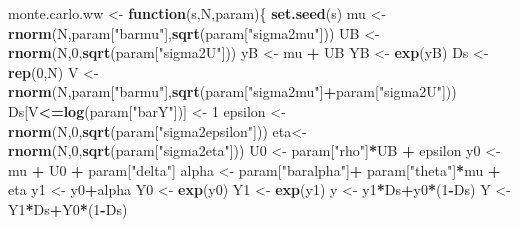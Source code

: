 \documentclass[]{book}
\newenvironment{Shaded}{\begin{snugshade}}{\end{snugshade}}
\newcommand{\KeywordTok}[1]{\textcolor[rgb]{0.13,0.29,0.53}{\textbf{#1}}}
\newcommand{\DecValTok}[1]{\textcolor[rgb]{0.00,0.00,0.81}{#1}}
\newcommand{\StringTok}[1]{\textcolor[rgb]{0.31,0.60,0.02}{#1}}
\newcommand{\ControlFlowTok}[1]{\textcolor[rgb]{0.13,0.29,0.53}{\textbf{#1}}}
\newcommand{\OperatorTok}[1]{\textcolor[rgb]{0.81,0.36,0.00}{\textbf{#1}}}
\newcommand{\NormalTok}[1]{#1}
\theoremstyle{definition}
\theoremstyle{definition}
\theoremstyle{definition}
\theoremstyle{remark}
\begin{document}
\begin{Shaded}
\begin{Highlighting}[]
\NormalTok{monte.carlo.ww <-}\StringTok{ }\ControlFlowTok{function}\NormalTok{(s,N,param)\{}
  \KeywordTok{set.seed}\NormalTok{(s)}
\NormalTok{  mu <-}\StringTok{ }\KeywordTok{rnorm}\NormalTok{(N,param[}\StringTok{"barmu"}\NormalTok{],}\KeywordTok{sqrt}\NormalTok{(param[}\StringTok{"sigma2mu"}\NormalTok{]))}
\NormalTok{  UB <-}\StringTok{ }\KeywordTok{rnorm}\NormalTok{(N,}\DecValTok{0}\NormalTok{,}\KeywordTok{sqrt}\NormalTok{(param[}\StringTok{"sigma2U"}\NormalTok{]))}
\NormalTok{  yB <-}\StringTok{ }\NormalTok{mu }\OperatorTok{+}\StringTok{ }\NormalTok{UB }
\NormalTok{  YB <-}\StringTok{ }\KeywordTok{exp}\NormalTok{(yB)}
\NormalTok{  Ds <-}\StringTok{ }\KeywordTok{rep}\NormalTok{(}\DecValTok{0}\NormalTok{,N)}
\NormalTok{  V <-}\StringTok{ }\KeywordTok{rnorm}\NormalTok{(N,param[}\StringTok{"barmu"}\NormalTok{],}\KeywordTok{sqrt}\NormalTok{(param[}\StringTok{"sigma2mu"}\NormalTok{]}\OperatorTok{+}\NormalTok{param[}\StringTok{"sigma2U"}\NormalTok{]))}
\NormalTok{  Ds[V}\OperatorTok{<=}\KeywordTok{log}\NormalTok{(param[}\StringTok{"barY"}\NormalTok{])] <-}\StringTok{ }\DecValTok{1} 
\NormalTok{  epsilon <-}\StringTok{ }\KeywordTok{rnorm}\NormalTok{(N,}\DecValTok{0}\NormalTok{,}\KeywordTok{sqrt}\NormalTok{(param[}\StringTok{"sigma2epsilon"}\NormalTok{]))}
\NormalTok{  eta<-}\StringTok{ }\KeywordTok{rnorm}\NormalTok{(N,}\DecValTok{0}\NormalTok{,}\KeywordTok{sqrt}\NormalTok{(param[}\StringTok{"sigma2eta"}\NormalTok{]))}
\NormalTok{  U0 <-}\StringTok{ }\NormalTok{param[}\StringTok{"rho"}\NormalTok{]}\OperatorTok{*}\NormalTok{UB }\OperatorTok{+}\StringTok{ }\NormalTok{epsilon}
\NormalTok{  y0 <-}\StringTok{ }\NormalTok{mu }\OperatorTok{+}\StringTok{  }\NormalTok{U0 }\OperatorTok{+}\StringTok{ }\NormalTok{param[}\StringTok{"delta"}\NormalTok{]}
\NormalTok{  alpha <-}\StringTok{ }\NormalTok{param[}\StringTok{"baralpha"}\NormalTok{]}\OperatorTok{+}\StringTok{  }\NormalTok{param[}\StringTok{"theta"}\NormalTok{]}\OperatorTok{*}\NormalTok{mu }\OperatorTok{+}\StringTok{ }\NormalTok{eta}
\NormalTok{  y1 <-}\StringTok{ }\NormalTok{y0}\OperatorTok{+}\NormalTok{alpha}
\NormalTok{  Y0 <-}\StringTok{ }\KeywordTok{exp}\NormalTok{(y0)}
\NormalTok{  Y1 <-}\StringTok{ }\KeywordTok{exp}\NormalTok{(y1)}
\NormalTok{  y <-}\StringTok{ }\NormalTok{y1}\OperatorTok{*}\NormalTok{Ds}\OperatorTok{+}\NormalTok{y0}\OperatorTok{*}\NormalTok{(}\DecValTok{1}\OperatorTok{-}\NormalTok{Ds)}
\NormalTok{  Y <-}\StringTok{ }\NormalTok{Y1}\OperatorTok{*}\NormalTok{Ds}\OperatorTok{+}\NormalTok{Y0}\OperatorTok{*}\NormalTok{(}\DecValTok{1}\OperatorTok{-}\NormalTok{Ds)}

\end{Highlighting}
\end{Shaded}
\end{document}
